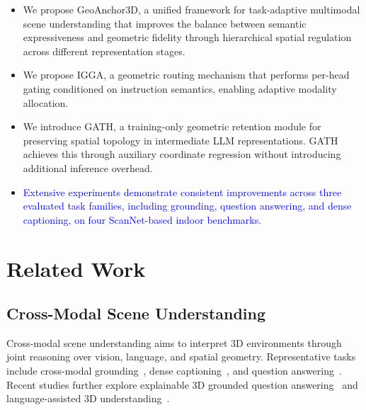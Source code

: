 \documentclass[lettersize,journal]{IEEEtran}
\begin{document}
\begin{itemize}

\item[(i)] We propose GeoAnchor3D, a unified framework for task-adaptive multimodal scene understanding that improves the balance between semantic expressiveness and geometric fidelity through {hierarchical spatial} regulation across different representation stages.

\item[(ii)] We propose IGGA, a geometric routing mechanism that performs per-head gating conditioned on instruction semantics, enabling adaptive modality allocation.

\item[(iii)] We introduce GATH, a training-only geometric retention module for preserving spatial topology in intermediate LLM representations. GATH achieves this through auxiliary coordinate regression without introducing additional inference overhead.

\item[(iv)] \textcolor{blue}{Extensive experiments demonstrate consistent improvements across three evaluated task families, including grounding, question answering, and dense captioning, on four ScanNet-based indoor benchmarks.}


\end{itemize}

\section{Related Work}

\subsection{Cross-Modal Scene Understanding}
Cross-modal scene understanding aims to interpret 3D environments through joint reasoning over vision, language, and spatial geometry. Representative tasks include cross-modal grounding~\cite{scanrefer2020, referit3d2020, multi3drefer2023}, dense captioning~\cite{scan2cap2021, Vote2Cap-DETR++2024, deng2024cdkm}, and question answering~\cite{scanqa2022, sqa3d2023}. Recent studies further explore explainable 3D grounded question answering~\cite{zhao2023fe3dgqa} and language-assisted 3D understanding~\cite{wu2025lastpcl}.
\end{document}
